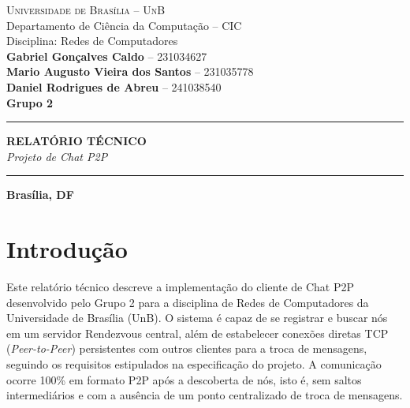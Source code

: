 \documentclass[12pt,a4paper]{article}
\begin{document}
\pagestyle{empty}

\begin{titlepage}
    \begin{center}
        {\Large \textsc{Universidade de Brasília -- UnB}}\\[0.2cm]
        {\large Departamento de Ciência da Computação -- CIC}\\[0.2cm]
        {\large Disciplina: Redes de Computadores}\\[3cm]

        {\large \textbf{Gabriel Gonçalves Caldo} -- 231034627}\\
        {\large \textbf{Mario Augusto Vieira dos Santos} -- 231035778}\\
        {\large \textbf{Daniel Rodrigues de Abreu} -- 241038540}\\[0.5cm]
        {\large \textbf{Grupo 2}}\\[4cm]

        \hrule
        \vspace{0.8cm}
        {\huge \textbf{RELATÓRIO TÉCNICO}}\\[0.4cm]
        {\LARGE \textit{Projeto de Chat P2P}}\\[0.8cm]
        \hrule
        \vfill

        {\large \textbf{Brasília, DF}}\\
        {\large \textbf{\the\year}}
    \end{center}
\end{titlepage}

\tableofcontents
\newpage


\section{Introdução}
Este relatório técnico descreve a implementação do cliente de Chat P2P desenvolvido pelo Grupo 2 para a disciplina de Redes de Computadores da Universidade de Brasília (UnB). O sistema é capaz de se registrar e buscar nós em um servidor Rendezvous central, além de estabelecer conexões diretas TCP (\textit{Peer-to-Peer}) persistentes com outros clientes para a troca de mensagens, seguindo os requisitos estipulados na especificação do projeto. A comunicação ocorre 100\% em formato P2P após a descoberta de nós, isto é, sem saltos intermediários e com a ausência de um ponto centralizado de troca de mensagens.
\end{document}
